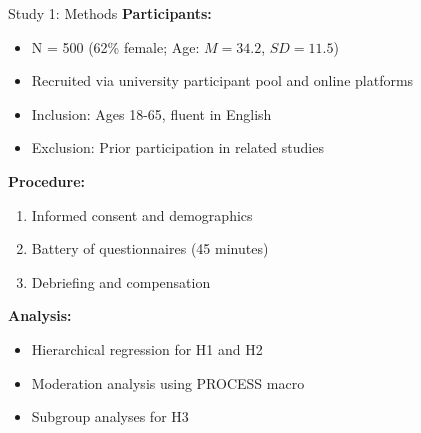 \documentclass[aspectratio=169,12pt]{beamer}
\begin{document}
\begin{frame}{Study 1: Methods}
  \textbf{Participants:}
  \begin{itemize}
    \item N = 500 (62\% female; Age: $M = 34.2$, $SD = 11.5$)
    \item Recruited via university participant pool and online platforms
    \item Inclusion: Ages 18-65, fluent in English
    \item Exclusion: Prior participation in related studies
  \end{itemize}

  \vspace{0.5cm}

  \textbf{Procedure:}
  \begin{enumerate}
    \item Informed consent and demographics
    \item Battery of questionnaires (45 minutes)
    \item Debriefing and compensation
  \end{enumerate}

  \vspace{0.5cm}

  \textbf{Analysis:}
  \begin{itemize}
    \item Hierarchical regression for H1 and H2
    \item Moderation analysis using PROCESS macro
    \item Subgroup analyses for H3
  \end{itemize}
\end{frame}
\end{document}
